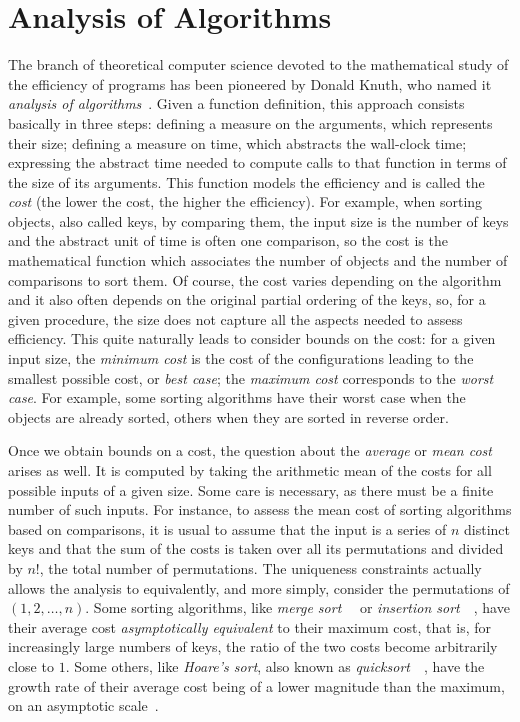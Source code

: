 \section{Analysis of Algorithms}

The branch of theoretical computer science devoted to the mathematical
study of the efficiency of programs has been pioneered by Donald
Knuth, who named it \emph{analysis of
  algorithms}~\cite{Knuth:1997,Knuth:2000,SedgewickFlajolet:1996}. Given
a function definition, this approach consists basically in three
steps: defining a measure on the arguments, which represents their
size; defining a measure on time, which abstracts the wall\hyp{}clock
time; expressing the abstract time needed to compute calls to that
function in terms of the size of its arguments. This function models
the efficiency and is called the \emph{cost} (the lower the cost, the
higher the efficiency). For example, when sorting objects, also called
keys, by comparing them, the input size is the number of keys and the
abstract unit of time is often one comparison, so the cost is the
mathematical function which associates the number of objects and the
number of comparisons to sort them. Of course, the cost varies
depending on the algorithm and it also often depends on the original
partial ordering of the keys, so, for a given procedure, the size does
not capture all the aspects needed to assess efficiency. This quite
naturally leads to consider bounds on the cost: for a given input
size, the \emph{minimum cost} is the cost of the configurations
leading to the smallest possible cost, or \emph{best case}; the
\emph{maximum cost} corresponds to the \emph{worst case}. For example,
some sorting algorithms have their worst case when the objects are
already sorted, others when they are sorted in reverse order.

Once we obtain bounds on a cost, the question about the \emph{average}
or \emph{mean cost}~\cite[\S{}1.2.10]{VitterFlajolet:1990,Knuth:1997}
arises as well. It is computed by taking the arithmetic mean of the
costs for all possible inputs of a given size. Some care is necessary,
as there must be a finite number of such inputs. For instance, to
assess the mean cost of sorting algorithms based on comparisons, it is
usual to assume that the input is a series of \(n\) distinct keys and
that the sum of the costs is taken over all its permutations and
divided by \(n!\), the total number of permutations. The uniqueness
constraints actually allows the analysis to equivalently, and more
simply, consider the permutations of \((1,2,\dots,n)\). Some sorting
algorithms, like
\emph{merge sort}~\cite[\S{}5.2.4]{Knuth:1998}~\cite[\S{}2.3]{CLRS:2009} or 
\emph{insertion sort}~\cite[\S{}5.2.1]{Knuth:1998}~\cite[\S{}2.1]{CLRS:2009}, 
have their average cost \emph{asymptotically equivalent} to their
maximum cost, that is, for increasingly large numbers of keys, the
ratio of the two costs become arbitrarily close to \(1\). Some others,
like \emph{Hoare's sort}, also known
as \emph{quicksort}~\cite[\S{}5.2.2]{Knuth:1998}~\cite[\S{}7]{CLRS:2009},
have the growth rate of their average cost being of a lower magnitude
than the maximum, on an asymptotic
scale~\cite[\S{}9]{GrahamKnuthPatashnik:1994}.

